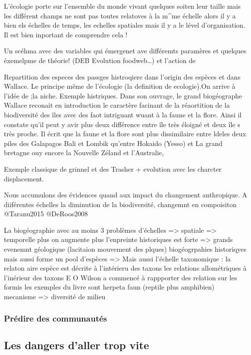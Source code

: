 L'écologie porte sur l'ensemble du monde vivant quelques soiten leur
taille mais les différent champs ne sont pas toutes relatoves à la
m\^{}me échelle alors il y a bien els échelles de temps, les echelles
spatiales mais il y a le lével d'organisation. Il est bien inportant de
comprendre cela !

Un scéhma avec des variables qui émergenet ave différemts paramères et
quelques éxemelpme de théorie! (DEB Evolution foodweb\ldots{}) et
l'action de

Repartition des especes des passges histroqiere dans l'origin des
espèces et dans Wallace. Le principe même de l'écologie (la definition
de ecologie).On arrive à l'idée de ;la niche. Exemple histriques. Dans
son ouvrage, le grand biogéographe Wallace reconait en introduction le
caractère facinant de la réaortition de la biodiversité des îles avec
des faot intriguant wuant à la faune et la flore. Ainsi il constate
qu'il peut y avir plus deux différence entre île très éloigné et deux
île s très proche. Il écrit que la faune et la flore sont plus
dissimilaire entre ldeles deux piles des Galapagos Bali et Lombik
qu'entre Hokaido (Yesso) et La grand bretagne ouy encore la Nouvelle
Zéland et l'Australie,

Exemple classique de grinnel et des Trasher + evolution avec les
charcter displacement.

Nous accumulons des évidences quand aux impact du changement
anthropique. A diiférentes échelles la diminution de la biodiversité,
changemnt en compoisiton @Taranu2015 @DeRoos2008

La biogéographie avec au moins 3 problèmes d'échelles =\textgreater{}
spatiale =\textgreater{} temporelle plus on augmente plus l'enpreinte
historiques est forte =\textgreater{} grands evenemnt géologique
(lacitaion mouvement des plques) biogéogrpahies historiqyes mais aussi
forme un pool d'espèces =\textgreater{} Mais aussi l'échelle taxonomique
: la relaton aire espèce est décrite à l'intérieru des taxons les
relations allométriques à l'inérieur des taxons E O Wilson a commencé à
rappporter des relation sur les formis les exemples du livre sont
herpeta faun (reptile plus amphibien) mecanisme =\textgreater{}
diversité de milieu

\subsubsection{Prédire des
communautés}\label{pruxe9dire-des-communautuxe9s}

\subsection*{Les dangers d'aller trop
vite}\label{les-dangers-daller-trop-vite}

